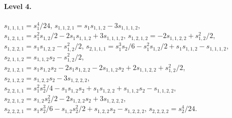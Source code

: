\documentclass[11pt,english]{article}
\theoremstyle{definition}
\theoremstyle{remark}
\begin{document}
\paragraph{Level 4.}
$s_{1,1,1,1}=s_{1}^{4} / 24$,
$s_{1,1,2,1}=s_{1} s_{1,1,2} - 3 s_{1,1,1,2}$,
$s_{1,2,1,1}=s_{1}^{2} s_{1,2} / 2 - 2 s_{1} s_{1,1,2} + 3 s_{1,1,1,2}$,
$s_{1,2,1,2}=- 2 s_{1,1,2,2} + s_{1,2}^{2} / 2$,
$s_{1,2,2,1}=s_{1} s_{1,2,2} - s_{1,2}^{2} / 2$,
$s_{2,1,1,1}=s_{1}^{3} s_{2} / 6 - s_{1}^{2} s_{1,2} / 2 + s_{1} s_{1,1,2} - s_{1,1,1,2}$,
$s_{2,1,1,2}=s_{1,1,2} s_{2} - s_{1,2}^{2} / 2$,
$s_{2,1,2,1}=s_{1} s_{1,2} s_{2} - 2 s_{1} s_{1,2,2} - 2 s_{1,1,2} s_{2} + 2 s_{1,1,2,2} + s_{1,2}^{2} / 2$,
$s_{2,1,2,2}=s_{1,2,2} s_{2} - 3 s_{1,2,2,2}$,
$s_{2,2,1,1}=s_{1}^{2} s_{2}^{2} / 4 - s_{1} s_{1,2} s_{2} + s_{1} s_{1,2,2} + s_{1,1,2} s_{2} - s_{1,1,2,2}$,
$s_{2,2,1,2}=s_{1,2} s_{2}^{2} / 2 - 2 s_{1,2,2} s_{2} + 3 s_{1,2,2,2}$,
$s_{2,2,2,1}=s_{1} s_{2}^{3} / 6 - s_{1,2} s_{2}^{2} / 2 + s_{1,2,2} s_{2} - s_{1,2,2,2}$,
$s_{2,2,2,2}=s_{2}^{4} / 24$.
\end{document}
